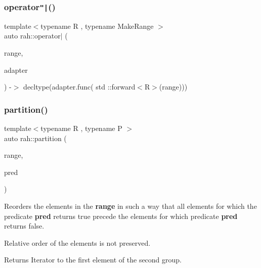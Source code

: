 \subsubsection{\texorpdfstring{operator\texttt{"|}()}{operator|()}}
{\footnotesize\ttfamily template$<$typename R , typename Make\+Range $>$ \\
auto rah\+::operator$\vert$ (\begin{DoxyParamCaption}\item[{R \&\&}]{range,  }\item[{\mbox{\hyperlink{structrah_1_1pipeable}{pipeable}}$<$ Make\+Range $>$ const \&}]{adapter }\end{DoxyParamCaption}) -\/$>$ decltype(adapter.\+func( std \+::forward$<$R$>$(range)))
}

\mbox{\label{namespacerah_a97ae3ed90fe486c2dd3a90fee811bcd7}} 
\subsubsection{\texorpdfstring{partition()}{partition()}\hspace{0.1cm}{\footnotesize\ttfamily [1/2]}}
{\footnotesize\ttfamily template$<$typename R , typename P $>$ \\
auto rah\+::partition (\begin{DoxyParamCaption}\item[{R \&\&}]{range,  }\item[{P \&\&}]{pred }\end{DoxyParamCaption})}



Reorders the elements in the {\bfseries{range}} in such a way that all elements for which the predicate {\bfseries{pred}} returns {\ttfamily true} precede the elements for which predicate {\bfseries{pred}} returns {\ttfamily false}. 

Relative order of the elements is not preserved. \begin{DoxyReturn}{Returns}
Iterator to the first element of the second group.
\end{DoxyReturn}

